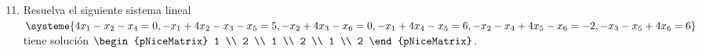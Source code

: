 \begin{frame}

	\begin{enumerate}\setcounter{enumi}{10}
		\item

		      Resuelva el siguiente sistema lineal
		      \begin{math}
			      \systeme{
			      4x_{1}-
			      x_{2}-
			      x_{4}=
			      0,
			      -x_{1}+
			      4x_{2}-
			      x_{3}-
			      x_{5}=
			      5,
			      -x_{2}+
			      4x_{3}-
			      x_{6}=
			      0,
			      -x_{1}+
			      4x_{4}-
			      x_{5}=
			      6,
			      -x_{2}-
			      x_{4}+
			      4x_{5}-
			      x_{6}=
			      -2,
			      -x_{3}-
			      x_{5}+
			      4x_{6}=
			      6
			      }
		      \end{math}
		      tiene solución
		      \begin{math}
			      \begin{pNiceMatrix}
				      1 \\
				      2 \\
				      1 \\
				      2 \\
				      1 \\
				      2
			      \end{pNiceMatrix}
		      \end{math}.


\end{enumerate}
\end{frame}
